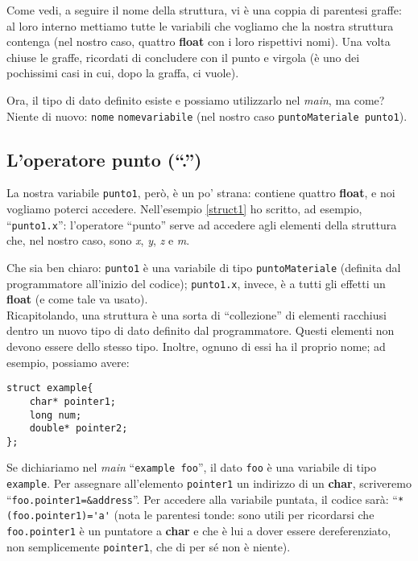 Come vedi, a seguire il nome della struttura, vi è una coppia di parentesi graffe: al loro interno mettiamo tutte le variabili che vogliamo che la nostra struttura contenga (nel nostro caso, quattro \textbf{float} con i loro rispettivi nomi). Una volta chiuse le graffe, ricordati di concludere con il punto e virgola (è uno dei pochissimi casi in cui, dopo la graffa, ci vuole).

Ora, il tipo di dato definito esiste e possiamo utilizzarlo nel \emph{main}, ma come? Niente di nuovo: \verb|nome| \verb|nomevariabile| (nel nostro caso \verb|puntoMateriale punto1|).

\subsection{L'operatore punto (``.'')}
La nostra variabile \verb|punto1|, però, è un po' strana: contiene quattro \textbf{float}, e noi vogliamo poterci accedere. Nell'esempio \ref{struct1} ho scritto, ad esempio, ``\verb|punto1.x|'': l'operatore ``punto'' serve ad accedere agli elementi della struttura che, nel nostro caso, sono \emph{x}, \emph{y}, \emph{z} e \emph{m}. 

Che sia ben chiaro: \verb|punto1| è una variabile di tipo \verb|puntoMateriale| (definita dal programmatore all'inizio del codice); \verb|punto1.x|, invece, è a tutti gli effetti un \textbf{float} (e come tale va usato).\\

Ricapitolando, una struttura è una sorta di ``collezione'' di elementi racchiusi dentro un nuovo tipo di dato definito dal programmatore. Questi elementi non devono essere dello stesso tipo. Inoltre, ognuno di essi ha il proprio nome; ad esempio, possiamo avere:
\begin{lstlisting}
struct example{
	char* pointer1;
	long num;
	double* pointer2;
};
\end{lstlisting}
Se dichiariamo nel \emph{main} ``\lstinline|example foo|'', il dato \verb|foo| è una variabile di tipo \verb|example|. Per assegnare all'elemento \verb|pointer1| un indirizzo di un \textbf{char}, scriveremo ``\lstinline|foo.pointer1=&address|''. Per accedere alla variabile puntata, il codice sarà: ``\lstinline|*(foo.pointer1)='a'| (nota le parentesi tonde: sono utili per ricordarsi che \verb|foo.pointer1| è un puntatore a \textbf{char} e che è lui a dover essere dereferenziato, non semplicemente \verb|pointer1|, che di per sé non è niente).\\

